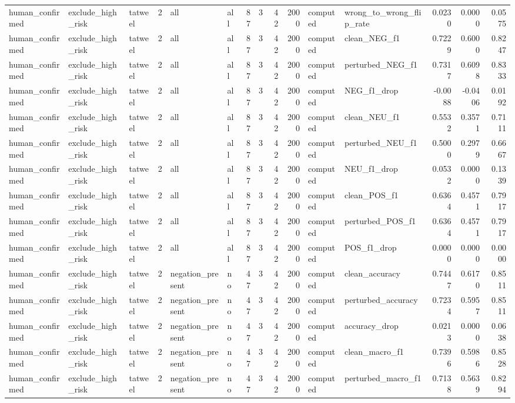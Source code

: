 \begin{tabular}{lllrllrrrrllrrr}
human_confirmed & exclude_high_risk & tatweel & 2 & all & all & 87 & 3 & 42 & 2000 & computed & wrong_to_wrong_flip_rate & 0.0230 & 0.0000 & 0.0575 \\
human_confirmed & exclude_high_risk & tatweel & 2 & all & all & 87 & 3 & 42 & 2000 & computed & clean_NEG_f1 & 0.7229 & 0.6000 & 0.8247 \\
human_confirmed & exclude_high_risk & tatweel & 2 & all & all & 87 & 3 & 42 & 2000 & computed & perturbed_NEG_f1 & 0.7317 & 0.6098 & 0.8333 \\
human_confirmed & exclude_high_risk & tatweel & 2 & all & all & 87 & 3 & 42 & 2000 & computed & NEG_f1_drop & -0.0088 & -0.0406 & 0.0192 \\
human_confirmed & exclude_high_risk & tatweel & 2 & all & all & 87 & 3 & 42 & 2000 & computed & clean_NEU_f1 & 0.5532 & 0.3571 & 0.7111 \\
human_confirmed & exclude_high_risk & tatweel & 2 & all & all & 87 & 3 & 42 & 2000 & computed & perturbed_NEU_f1 & 0.5000 & 0.2979 & 0.6667 \\
human_confirmed & exclude_high_risk & tatweel & 2 & all & all & 87 & 3 & 42 & 2000 & computed & NEU_f1_drop & 0.0532 & 0.0000 & 0.1339 \\
human_confirmed & exclude_high_risk & tatweel & 2 & all & all & 87 & 3 & 42 & 2000 & computed & clean_POS_f1 & 0.6364 & 0.4571 & 0.7917 \\
human_confirmed & exclude_high_risk & tatweel & 2 & all & all & 87 & 3 & 42 & 2000 & computed & perturbed_POS_f1 & 0.6364 & 0.4571 & 0.7917 \\
human_confirmed & exclude_high_risk & tatweel & 2 & all & all & 87 & 3 & 42 & 2000 & computed & POS_f1_drop & 0.0000 & 0.0000 & 0.0000 \\
human_confirmed & exclude_high_risk & tatweel & 2 & negation_present & no & 47 & 3 & 42 & 2000 & computed & clean_accuracy & 0.7447 & 0.6170 & 0.8511 \\
human_confirmed & exclude_high_risk & tatweel & 2 & negation_present & no & 47 & 3 & 42 & 2000 & computed & perturbed_accuracy & 0.7234 & 0.5957 & 0.8511 \\
human_confirmed & exclude_high_risk & tatweel & 2 & negation_present & no & 47 & 3 & 42 & 2000 & computed & accuracy_drop & 0.0213 & 0.0000 & 0.0638 \\
human_confirmed & exclude_high_risk & tatweel & 2 & negation_present & no & 47 & 3 & 42 & 2000 & computed & clean_macro_f1 & 0.7396 & 0.5986 & 0.8528 \\
human_confirmed & exclude_high_risk & tatweel & 2 & negation_present & no & 47 & 3 & 42 & 2000 & computed & perturbed_macro_f1 & 0.7138 & 0.5639 & 0.8294 \\

\end{tabular}
